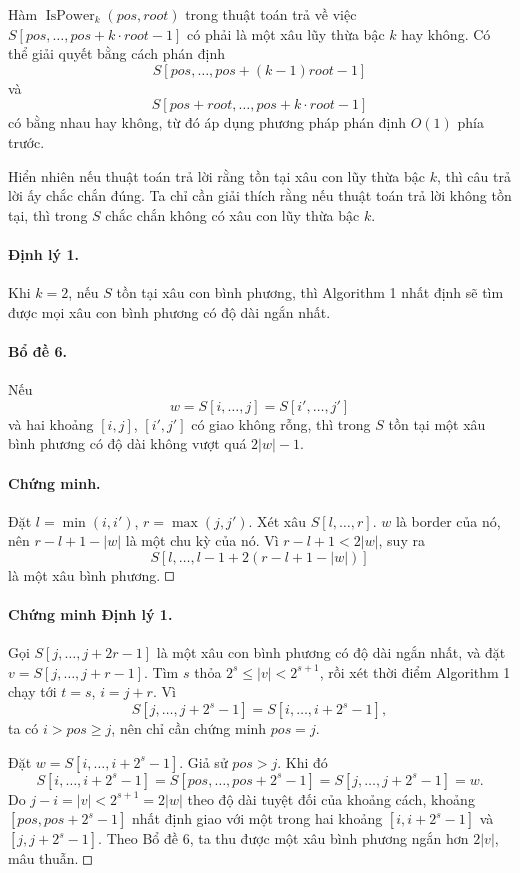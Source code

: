 \documentclass[11pt]{article}
\newcommand{\square}{\mathord{\vcenter{\hrule height .5pt
  \hbox{\vrule width .5pt height 5pt\kern5pt\vrule width .5pt}
  \hrule height .5pt}}}
\begin{document}
Hàm \(\operatorname{IsPower}_k(\mathit{pos},\mathit{root})\) trong thuật toán
trả về việc \(S[\mathit{pos},\ldots,\mathit{pos}+k\cdot\mathit{root}-1]\) có
phải là một xâu lũy thừa bậc \(k\) hay không. Có thể giải quyết bằng cách phán
định
\[
  S[\mathit{pos},\ldots,\mathit{pos}+(k-1)\mathit{root}-1]
\]
và
\[
  S[\mathit{pos}+\mathit{root},\ldots,\mathit{pos}+k\cdot\mathit{root}-1]
\]
có bằng nhau hay không, từ đó áp dụng phương pháp phán định \(O(1)\) phía
trước.

Hiển nhiên nếu thuật toán trả lời rằng tồn tại xâu con lũy thừa bậc \(k\), thì
câu trả lời ấy chắc chắn đúng. Ta chỉ cần giải thích rằng nếu thuật toán trả
lời không tồn tại, thì trong \(S\) chắc chắn không có xâu con lũy thừa bậc
\(k\).

\paragraph{Định lý 1.}
Khi \(k=2\), nếu \(S\) tồn tại xâu con bình phương, thì Algorithm 1 nhất định
sẽ tìm được mọi xâu con bình phương có độ dài ngắn nhất.

\paragraph{Bổ đề 6.}
Nếu
\[
  w=S[i,\ldots,j]=S[i',\ldots,j']
\]
và hai khoảng \([i,j]\), \([i',j']\) có giao không rỗng, thì trong \(S\) tồn
tại một xâu bình phương có độ dài không vượt quá \(2|w|-1\).

\paragraph{Chứng minh.}
Đặt \(l=\min(i,i')\), \(r=\max(j,j')\). Xét xâu \(S[l,\ldots,r]\). \(w\) là
border của nó, nên \(r-l+1-|w|\) là một chu kỳ của nó. Vì \(r-l+1<2|w|\), suy
ra
\[
  S[l,\ldots,l-1+2(r-l+1-|w|)]
\]
là một xâu bình phương. \(\square\)

\paragraph{Chứng minh Định lý 1.}
Gọi \(S[j,\ldots,j+2r-1]\) là một xâu con bình phương có độ dài ngắn nhất, và
đặt \(v=S[j,\ldots,j+r-1]\). Tìm \(s\) thỏa \(2^s\le |v|<2^{s+1}\), rồi xét
thời điểm Algorithm 1 chạy tới \(t=s\), \(i=j+r\). Vì
\[
  S[j,\ldots,j+2^s-1]=S[i,\ldots,i+2^s-1],
\]
ta có \(i>\mathit{pos}\ge j\), nên chỉ cần chứng minh \(\mathit{pos}=j\).

Đặt \(w=S[i,\ldots,i+2^s-1]\). Giả sử \(\mathit{pos}>j\). Khi đó
\[
  S[i,\ldots,i+2^s-1]
  =S[\mathit{pos},\ldots,\mathit{pos}+2^s-1]
  =S[j,\ldots,j+2^s-1]=w.
\]
Do \(j-i=|v|<2^{s+1}=2|w|\) theo độ dài tuyệt đối của khoảng cách, khoảng
\([\mathit{pos},\mathit{pos}+2^s-1]\) nhất định giao với một trong hai khoảng
\([i,i+2^s-1]\) và \([j,j+2^s-1]\). Theo Bổ đề 6, ta thu được một xâu bình
phương ngắn hơn \(2|v|\), mâu thuẫn. \(\square\)
\end{document}
